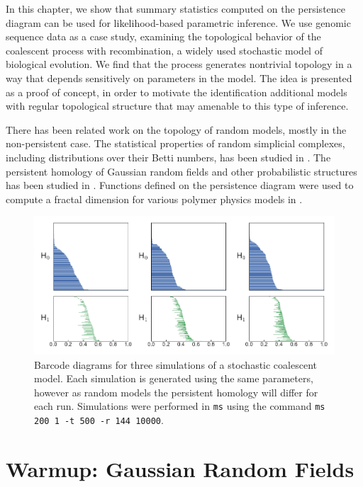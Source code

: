 In this chapter, we show that summary statistics computed on the persistence diagram can be used for likelihood-based parametric inference.
We use genomic sequence data as a case study, examining the topological behavior of the coalescent process with recombination, a widely used stochastic model of biological evolution.
We find that the process generates nontrivial topology in a way that depends sensitively on parameters in the model.
The idea is presented as a proof of concept, in order to motivate the identification additional models with regular topological structure that may amenable to this type of inference.

There has been related work on the topology of random models, mostly in the non-persistent case.
The statistical properties of random simplicial complexes, including distributions over their Betti numbers, has been studied in \cite{Kahle:2011ep,Kahle:2013vy}.
The persistent homology of Gaussian random fields and other probabilistic structures has been studied in \cite{Adler:2010}.
Functions defined on the persistence diagram were used to compute a fractal dimension for various polymer physics models in \cite{MacPherson:2012eq}.


\begin{figure}
\centering
\includegraphics[width=\textwidth]{fig/parametric_inference/sim_barcodes.pdf}
\caption[Barcode Diagrams for Three Coalescent Simulations]{Barcode diagrams for three simulations of a stochastic coalescent model. Each simulation is generated using the same parameters, however as random models the persistent homology will differ for each run. Simulations were performed in \texttt{ms} using the command \texttt{ms 200 1 -t 500 -r 144 10000}.}
\label{fig:sim_barcodes}
\end{figure}

\section{Warmup: Gaussian Random Fields}

